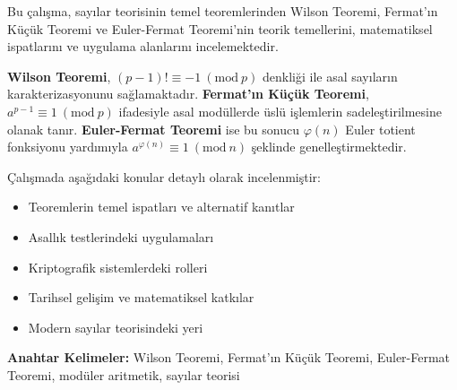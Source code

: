 
\newpage
\phantom{omur}



\begin{flushleft}
\end{flushleft}
\vspace{1.75cm}

\noindent Bu çalışma, sayılar teorisinin temel teoremlerinden Wilson Teoremi, Fermat'ın Küçük Teoremi ve Euler-Fermat Teoremi'nin teorik temellerini, matematiksel ispatlarını ve uygulama alanlarını incelemektedir.

\textbf{Wilson Teoremi}, $(p-1)! \equiv -1 \ (\mathrm{mod}\ p)$ denkliği ile asal sayıların karakterizasyonunu sağlamaktadır. \textbf{Fermat'ın Küçük Teoremi}, $a^{p-1} \equiv 1 \ (\mathrm{mod}\ p)$ ifadesiyle asal modüllerde üslü işlemlerin sadeleştirilmesine olanak tanır. \textbf{Euler-Fermat Teoremi} ise bu sonucu $\varphi(n)$ Euler totient fonksiyonu yardımıyla $a^{\varphi(n)} \equiv 1 \ (\mathrm{mod}\ n)$ şeklinde genelleştirmektedir.

Çalışmada aşağıdaki konular detaylı olarak incelenmiştir:

\begin{itemize}
    \item Teoremlerin temel ispatları ve alternatif kanıtlar
    \item Asallık testlerindeki uygulamaları
    \item Kriptografik sistemlerdeki rolleri
    \item Tarihsel gelişim ve matematiksel katkılar
    \item Modern sayılar teorisindeki yeri
\end{itemize}

\vspace{1cm}
\noindent\textbf{Anahtar Kelimeler:} Wilson Teoremi, Fermat'ın Küçük Teoremi, Euler-Fermat Teoremi, modüler aritmetik, sayılar teorisi



